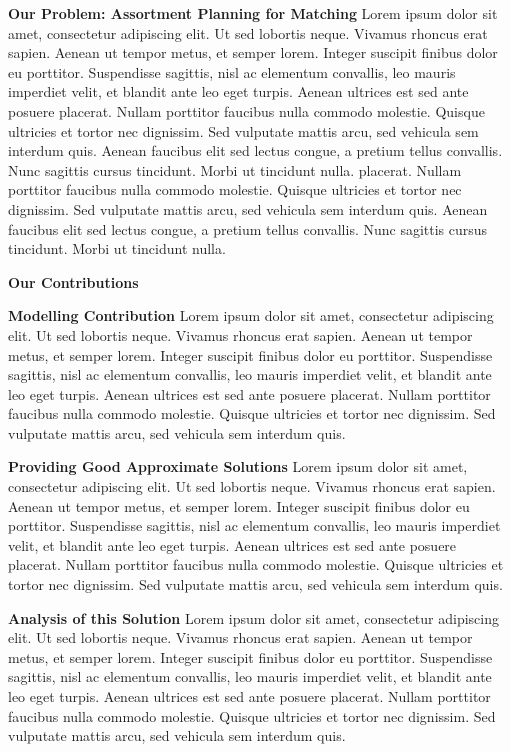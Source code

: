 \textbf{Our Problem: Assortment Planning for Matching}
Lorem ipsum dolor sit amet, consectetur adipiscing elit. Ut sed lobortis neque. Vivamus rhoncus erat sapien. Aenean ut tempor metus, et semper lorem. Integer suscipit finibus dolor eu porttitor. Suspendisse sagittis, nisl ac elementum convallis, leo mauris imperdiet velit, et blandit ante leo eget turpis. Aenean ultrices est sed ante posuere placerat. Nullam porttitor faucibus nulla commodo molestie. Quisque ultricies et tortor nec dignissim. Sed vulputate mattis arcu, sed vehicula sem interdum quis. Aenean faucibus elit sed lectus congue, a pretium tellus convallis. Nunc sagittis cursus tincidunt. Morbi ut tincidunt nulla.
placerat. Nullam porttitor faucibus nulla commodo molestie. Quisque ultricies et tortor nec dignissim. Sed vulputate mattis arcu, sed vehicula sem interdum quis. Aenean faucibus elit sed lectus congue, a pretium tellus convallis. Nunc sagittis cursus tincidunt. Morbi ut tincidunt nulla.

\textbf{Our Contributions}

\textbf{Modelling Contribution}
Lorem ipsum dolor sit amet, consectetur adipiscing elit. Ut sed lobortis neque. Vivamus rhoncus erat sapien. Aenean ut tempor metus, et semper lorem. Integer suscipit finibus dolor eu porttitor. Suspendisse sagittis, nisl ac elementum convallis, leo mauris imperdiet velit, et blandit ante leo eget turpis. Aenean ultrices est sed ante posuere placerat. Nullam porttitor faucibus nulla commodo molestie. Quisque ultricies et tortor nec dignissim. Sed vulputate mattis arcu, sed vehicula sem interdum quis.

\textbf{Providing Good Approximate Solutions}
Lorem ipsum dolor sit amet, consectetur adipiscing elit. Ut sed lobortis neque. Vivamus rhoncus erat sapien. Aenean ut tempor metus, et semper lorem. Integer suscipit finibus dolor eu porttitor. Suspendisse sagittis, nisl ac elementum convallis, leo mauris imperdiet velit, et blandit ante leo eget turpis. Aenean ultrices est sed ante posuere placerat. Nullam porttitor faucibus nulla commodo molestie. Quisque ultricies et tortor nec dignissim. Sed vulputate mattis arcu, sed vehicula sem interdum quis.

\textbf{Analysis of this Solution}
Lorem ipsum dolor sit amet, consectetur adipiscing elit. Ut sed lobortis neque. Vivamus rhoncus erat sapien. Aenean ut tempor metus, et semper lorem. Integer suscipit finibus dolor eu porttitor. Suspendisse sagittis, nisl ac elementum convallis, leo mauris imperdiet velit, et blandit ante leo eget turpis. Aenean ultrices est sed ante posuere placerat. Nullam porttitor faucibus nulla commodo molestie. Quisque ultricies et tortor nec dignissim. Sed vulputate mattis arcu, sed vehicula sem interdum quis.

